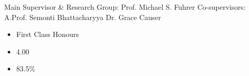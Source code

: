 \documentclass[10pt,a4paper,ragged2e,withhyper]{altacv}
\begin{document}
\begin{paracol}{2}
			Main Supervisor \& Research Group: \hspace{3.5cm} \faUserFriends Prof. Michael S. Fuhrer
			Co-supervisors: \hspace{1.7cm}\faUserFriends A.Prof. Semonti Bhattacharyya \hspace{0.5cm}\faUserFriends Dr. Grace Causer

%			
%			

	        \vspace{-5pt}
            \divider
            \vspace{-5pt}
            \vspace{-2em}
            \begin{multicols}{3}
            	\begin{itemize}[noitemsep,topsep=0pt]
            		\item First Class Honours
            		\item {}4.00
            		\item {}83.5\%
            	\end{itemize}
            \end{multicols}
	        \vspace{-2em}
        	\divider
        	

\end{paracol}
\end{document}
